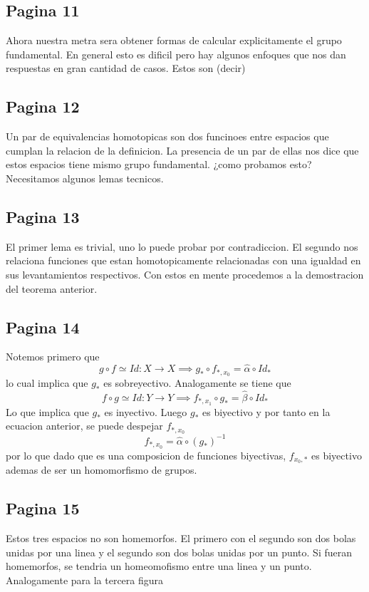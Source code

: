 \documentclass[letterpaper]{article}
\begin{document}
\subsection*{Pagina 11}
Ahora nuestra metra sera obtener formas de calcular explicitamente el
grupo fundamental. En general esto es dificil pero hay algunos enfoques
que nos dan respuestas en gran cantidad de casos. Estos son (decir)

\subsection*{Pagina 12}
Un par de equivalencias homotopicas son dos funcinoes entre espacios que
cumplan la relacion de la definicion. La presencia de un par de ellas
nos dice que estos espacios tiene mismo grupo fundamental. ¿como
probamos esto? Necesitamos algunos lemas tecnicos.

\subsection*{Pagina 13}
El primer lema es trivial, uno lo puede probar por contradiccion. El
segundo nos relaciona funciones que estan homotopicamente relacionadas
con una igualdad en sus levantamientos respectivos. Con estos en mente
procedemos a la demostracion del teorema anterior.

\subsection*{Pagina 14}
Notemos primero que
\[ g \circ f \simeq Id : X \to X \implies g_* \circ f_{*,x_0} = \hat
  \alpha \circ Id_* \]
lo cual implica que \(g_*\) es sobreyectivo. Analogamente se tiene que
\[ f \circ g \simeq Id : Y \to Y \implies f_{*,x_1} \circ g_* = \hat
  \beta \circ Id_* \]
Lo que implica que \(g_*\) es inyectivo. Luego \(g_*\) es biyectivo y
por tanto en la ecuacion anterior, se puede despejar \(f_{*,x_0}\)
\[ f_{*,x_0} = \hat \alpha \circ \left( g_{*} \right)^{-1}\]
por lo que dado que es una composicion de funciones biyectivas,
\(f_{x_0,*}\) es biyectivo ademas de ser un homomorfismo de grupos.

\subsection*{Pagina 15}
Estos tres espacios no son homemorfos. El primero con el segundo son dos
bolas unidas por una linea y el segundo son dos bolas unidas por un
punto. Si fueran homemorfos, se tendria un homeomofismo entre una linea
y un punto. Analogamente para la tercera figura
\end{document}

